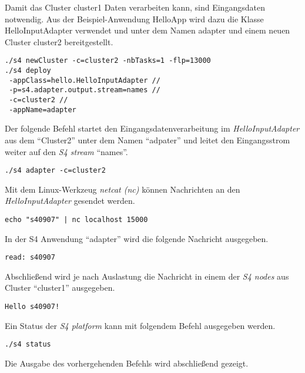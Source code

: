 Damit das Cluster cluster1 Daten verarbeiten kann, sind Eingangsdaten notwendig. Aus der Beispiel-Anwendung HelloApp wird dazu die Klasse HelloInputAdapter verwendet und unter dem Namen adapter und einem neuen Cluster cluster2 bereitgestellt.

\begin{verbatim}
./s4 newCluster -c=cluster2 -nbTasks=1 -flp=13000
./s4 deploy 
 -appClass=hello.HelloInputAdapter //
 -p=s4.adapter.output.stream=names //
 -c=cluster2 //
 -appName=adapter
\end{verbatim}

Der folgende Befehl startet den Eingangsdatenverarbeitung im \textit{HelloInputAdapter} aus dem "`Cluster2"' unter dem Namen "`adpater"' und leitet den Eingangsstrom weiter auf den \textit{S4 stream} "`names"'.

\begin{verbatim}
./s4 adapter -c=cluster2
\end{verbatim}

Mit dem Linux-Werkzeug \textit{netcat (nc)} können Nachrichten an den \textit{HelloInputAdapter} gesendet werden.

\begin{verbatim}
echo "s40907" | nc localhost 15000
\end{verbatim}

In der S4 Anwendung "`adapter"' wird die folgende Nachricht ausgegeben.

\begin{verbatim}
read: s40907
\end{verbatim}

Abschließend wird je nach Auslastung die Nachricht in einem der \textit{S4 nodes} aus Cluster "`cluster1"' ausgegeben.

\begin{verbatim}
Hello s40907!
\end{verbatim}

Ein Status der \textit{S4 platform} kann mit folgendem Befehl ausgegeben werden.

\begin{verbatim}
./s4 status
\end{verbatim}

Die Ausgabe des vorhergehenden Befehls wird abschließend gezeigt.

